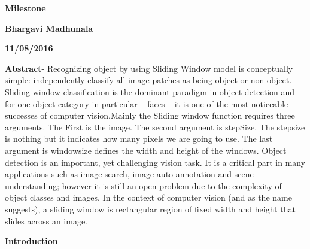 \documentclass[12pt]{article}
\begin{document}
\begin{titlepage}
\begin{center}
\vspace*{1cm}
\textbf{Milestone}
\vspace{0.5cm}

\textbf{Bhargavi Madhunala}
\vspace{0.5cm}

\textbf{11/08/2016}
\end{center}
\end{titlepage}

\textbf{Abstract}- Recognizing object by using Sliding Window model is conceptually simple: independently classify all image patches as being object or non-object. Sliding window classification is the dominant paradigm in object detection and for one object category in particular -- faces -- it is one of the most noticeable successes of computer vision.Mainly the Sliding window function requires three arguments. The First is the image. The second argument is stepSize. The stepsize is nothing but it indicates how many pixels we are going to use. The last argument is windowsize defines the width and height of the windows. Object detection is an important, yet challenging vision task. It is a critical part in many applications such as image search, image auto-annotation and scene understanding; however it is still an open problem due to the complexity of object classes and images. In the context of computer vision (and as the name suggests), a sliding window is rectangular region of fixed width and height that slides across an image.

\textbf{Introduction}
\end{document}
